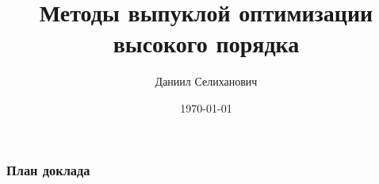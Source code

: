 \documentclass[12pt]{beamer}
\title[Тензорные методы]{Методы выпуклой оптимизации высокого порядка} %
\author{Даниил Селиханович} %
\institute[МФТИ] %
{
МФТИ\\ 
ИППИ им. Харкевича РАН \\ %
\medskip
\textit{selihanovich.do@phystech.edu} %
}
\date{\today} %
\begin{document}
\begin{frame}
\titlepage %
\end{frame}

\begin{frame}
\frametitle{План доклада} %
\tableofcontents %
\end{frame}


\end{document}
